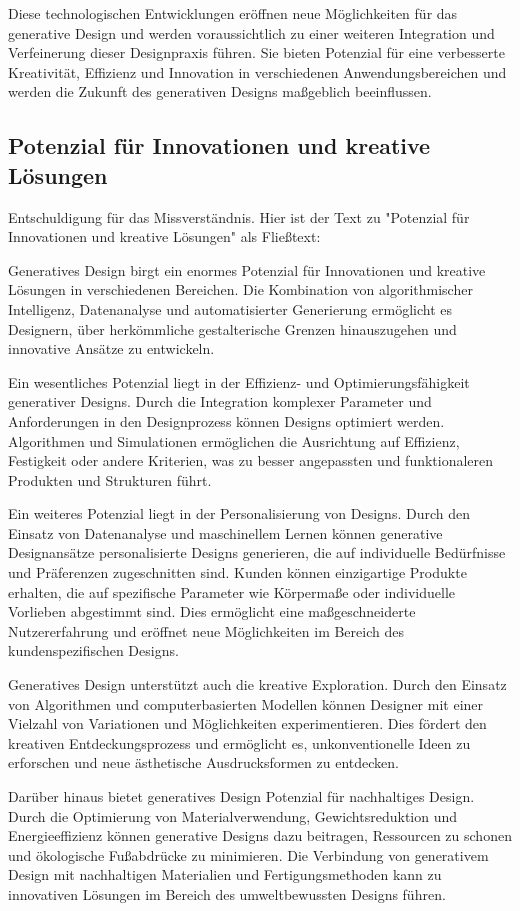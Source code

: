 Diese technologischen Entwicklungen eröffnen neue Möglichkeiten für das generative Design und werden voraussichtlich zu einer weiteren Integration und Verfeinerung dieser Designpraxis führen. Sie bieten Potenzial für eine verbesserte Kreativität, Effizienz und Innovation in verschiedenen Anwendungsbereichen und werden die Zukunft des generativen Designs maßgeblich beeinflussen.

\subsection*{Potenzial für Innovationen und kreative Lösungen}
Entschuldigung für das Missverständnis. Hier ist der Text zu "Potenzial für Innovationen und kreative Lösungen" als Fließtext:

Generatives Design birgt ein enormes Potenzial für Innovationen und kreative Lösungen in verschiedenen Bereichen. Die Kombination von algorithmischer Intelligenz, Datenanalyse und automatisierter Generierung ermöglicht es Designern, über herkömmliche gestalterische Grenzen hinauszugehen und innovative Ansätze zu entwickeln.

Ein wesentliches Potenzial liegt in der Effizienz- und Optimierungsfähigkeit generativer Designs. Durch die Integration komplexer Parameter und Anforderungen in den Designprozess können Designs optimiert werden. Algorithmen und Simulationen ermöglichen die Ausrichtung auf Effizienz, Festigkeit oder andere Kriterien, was zu besser angepassten und funktionaleren Produkten und Strukturen führt.

Ein weiteres Potenzial liegt in der Personalisierung von Designs. Durch den Einsatz von Datenanalyse und maschinellem Lernen können generative Designansätze personalisierte Designs generieren, die auf individuelle Bedürfnisse und Präferenzen zugeschnitten sind. Kunden können einzigartige Produkte erhalten, die auf spezifische Parameter wie Körpermaße oder individuelle Vorlieben abgestimmt sind. Dies ermöglicht eine maßgeschneiderte Nutzererfahrung und eröffnet neue Möglichkeiten im Bereich des kundenspezifischen Designs.

Generatives Design unterstützt auch die kreative Exploration. Durch den Einsatz von Algorithmen und computerbasierten Modellen können Designer mit einer Vielzahl von Variationen und Möglichkeiten experimentieren. Dies fördert den kreativen Entdeckungsprozess und ermöglicht es, unkonventionelle Ideen zu erforschen und neue ästhetische Ausdrucksformen zu entdecken.

Darüber hinaus bietet generatives Design Potenzial für nachhaltiges Design. Durch die Optimierung von Materialverwendung, Gewichtsreduktion und Energieeffizienz können generative Designs dazu beitragen, Ressourcen zu schonen und ökologische Fußabdrücke zu minimieren. Die Verbindung von generativem Design mit nachhaltigen Materialien und Fertigungsmethoden kann zu innovativen Lösungen im Bereich des umweltbewussten Designs führen.

